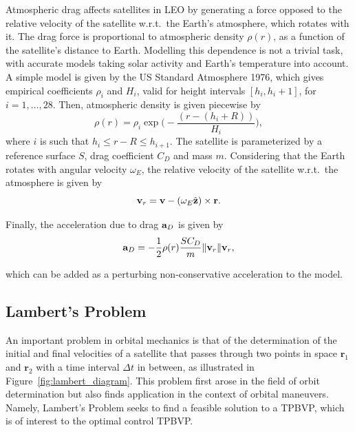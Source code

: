 Atmospheric drag affects satellites in LEO by generating a force opposed to the relative velocity of the satellite w.r.t.\ the Earth's atmosphere, which rotates with it. The drag force is proportional to atmospheric density \(\rho(r)\), as a function of the satellite's distance to Earth. Modelling this dependence is not a trivial task, with accurate models taking solar activity and Earth's temperature into account. A simple model is given by the US Standard Atmosphere 1976, which gives empirical coefficients \(\rho_i\) and \(H_i\), valid for height intervals \([h_i, h_i+1]\), for \(i = 1,\dots, 28\). Then, atmospheric density is given piecewise by
\begin{equation}\label{eq:rho}
    \rho(r) = \rho_i \exp{\big(-\frac{\left(r - (h_i + R)\right)}{H_i}\big)},
\end{equation}
where \(i\) is such that \(h_i \leq r - R \leq h_{i+1}\). The satellite is parameterized by a reference surface \(S\), drag coefficient \(C_D\) and mass \(m\). Considering that the Earth rotates with angular velocity \(\omega_E\), the relative velocity of the satellite w.r.t.\ the atmosphere is given by
\begin{equation}
    \mathbf{v}_{r} = \mathbf{v} - (\omega_E \hat{\mathbf{z}}) \times \mathbf{r}.
\end{equation}

Finally, the acceleration due to drag \(\mathbf{a}_D\) is given by
\begin{equation}\label{eq:acc_drag}
    \acc_D = - \frac{1}{2} \rho(r) \frac{S C_D}{m} \lVert \vel_r \rVert \vel_r,
\end{equation}

which can be added as a perturbing non-conservative acceleration to the model.

\subsection{Lambert's Problem}

An important problem in orbital mechanics is that of the determination of the initial and final velocities of a satellite that passes through two points in space \(\mathbf{r}_1\) and \(\mathbf{r}_2\) with a time interval \(\Delta t\) in between, as illustrated in Figure~\ref{fig:lambert_diagram}. This problem first arose in the field of orbit determination but also finds application in the context of orbital maneuvers. Namely, Lambert's Problem seeks to find a feasible solution to a TPBVP, which is of interest to the optimal control TPBVP. 


